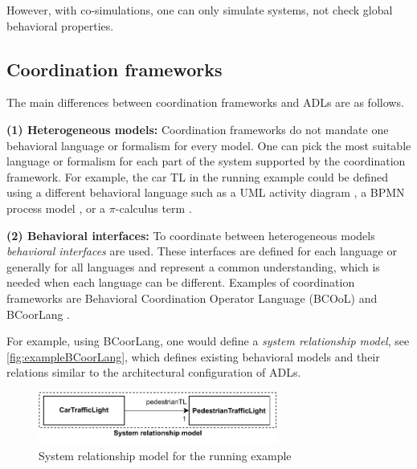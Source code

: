 \documentclass[runningheads]{llncs}
\begin{document}
However, with co-simulations, one can only simulate systems, not check global behavioral properties.

\subsection{Coordination frameworks} \label{subsec:frameworks}

The main differences between coordination frameworks and ADLs are as follows.

\textbf{(1) Heterogeneous models:} Coordination frameworks do not mandate one behavioral language or formalism for every model.
One can pick the most suitable language or formalism for each part of the system supported by the coordination framework.
For example, the car TL in the running example could be defined using a different behavioral language such as a UML activity diagram \cite{objectmanagementgroupUnifiedModelingLanguage2017}, a BPMN process model \cite{objectmanagementgroupBusinessProcessModel2013}, or a $\pi$-calculus term \cite{milnerCommunicatingMobileSystems2010}.

\textbf{(2) Behavioral interfaces:} To coordinate between heterogeneous models \textit{behavioral interfaces} are used.
These interfaces are defined for each language or generally for all languages and represent a common understanding, which is needed when each language can be different.
Examples of coordination frameworks are Behavioral Coordination Operator Language (BCOoL) \cite{varalarsenBCOolBehavioralCoordination2016,varalarsenBehavioralCoordinationOperator2015} and BCoorLang \cite{krauterBehavioralConsistencyMultimodeling2023}.

For example, using BCoorLang, one would define a \textit{system relationship model}, see \autoref{fig:exampleBCoorLang}, which defines existing behavioral models and their relations similar to the architectural configuration of ADLs.

\begin{figure}[ht]
	\centering
	\includegraphics[width=0.7\textwidth]{images/running_example_BCorrLang}
	\caption{System relationship model for the running example}
	\label{fig:exampleBCoorLang}
\end{figure}
\end{document}
